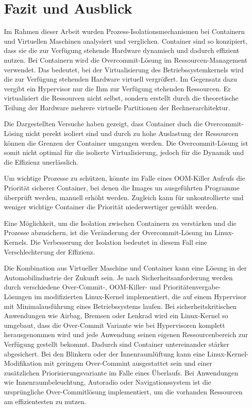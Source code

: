 \thispagestyle{empty}
\section{Fazit und Ausblick}

Im Rahmen dieser Arbeit wurden Prozess-Isolationsmechanismen bei Containern und Virtuellen Maschinen analysiert und verglichen. Container sind so konzipiert, dass sie die zur Verfügung stehende Hardware dynamisch und dadurch effizient nutzen. Bei Containern wird die Overcommit-Lösung im Ressourcen-Management verwendet. Das bedeutet, bei der Virtualisierung des Betriebssystemkernels wird die zur Verfügung stehenden Hardware virtuell vergrößert. Im Gegensatz dazu vergibt ein Hypervisor nur die Ihm zur Verfügung stehenden Ressourcen. Er virtualisiert die Ressourcen nicht selbst, sondern erstellt durch die theoretische Teilung der Hardware mehrere virtuelle Partitionen der Rechnerarchitektur. 

Die Dargestellten Versuche haben gezeigt, dass Container duch die Overcommit-Lösing nicht perekt isoliert sind und durch zu hohe Auslastung der Ressourcen können die Grenzen der Container umgangen werden. Die Overcommit-Lösung ist somit nicht optimal für die isolierte Virtualisierung, jedoch für die Dynamik und die Effizienz unerlässlich.

Um wichtige Prozesse zu schützen, könnte im Falle eines OOM-Killer Aufrufs die Priorität sicherer Container, bei denen die Images un ausgeführten Programme überprüft werden, manuell erhöht werden. Zugleich kann für unkontrollierte und weniger wichtige Container die Priorität niederwertiger gewählt werden.

Eine Möglichkeit, um die Isolation zwischen Containern zu verstärken und die Prozesse abzusichern, ist die Veränderung der Overcommit-Lösung im Linux-Kernels. Die Verbesserung der Isolation bedeutet in diesem Fall eine Verschlechterung der Effizienz. 

Die Kombination aus Virtueller Maschine und Container kann eine Lösung in der Automobilindustrie der Zukunft sein. Je nach Sicherheitsanforderung werden durch verschiedene Over-Commit-, OOM-Killer- und Prioritätenvergabe-Lösungen im modifizierten Linux-Kernel implementiert, die auf einem Hypervisor mit Minimalausführung eines Betriebssystems laufen. Bei sicherheitskritischen Anwendungen wie Airbag, Bremsen oder Lenkrad wird ein Linux-Kernel so umgebaut, dass die Over-Commit Variante wie bei Hypervisoren komplett herausgenommen wird und jede Anwendung seinen eigenen Ressourcenbereich zur Verfügung gestellt bekommt. Dadurch sind Container untereinander stärker abgesichert. Bei den Blinkern oder der Innenraumlüftung kann eine Linux-Kernel-Modifikation mit geringem Over-Commint ausgestattet sein und einer zusätzlichen Priorisierungsvariante im Falle eines Überlaufs. Bei Anwendungen wie Innenraumbeleuchtung, Autoradio oder Navigationssystem ist die ursprüngliche Over-Commitlösung implementiert, um die vorhanden Ressourcen am effizientesten zu nutzen.

